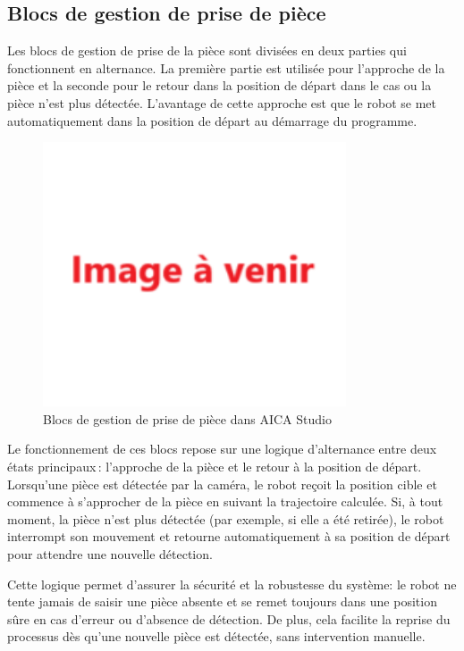 \subsection{Blocs de gestion de prise de pièce}

Les blocs de gestion de prise de la pièce sont divisées en deux parties qui fonctionnent en alternance. La première partie est utilisée pour l'approche de la pièce et la seconde pour le retour dans la position de départ dans le cas ou la pièce n'est plus détectée. L'avantage de cette approche est que le robot se met automatiquement dans la position de départ au démarrage du programme.

\begin{figure}[H]
    \centering
    \includegraphics[width=0.8\textwidth]{assets/figures/img_a_venir.png}
    \caption{Blocs de gestion de prise de pièce dans AICA Studio}
    \label{fig:piece_block}
\end{figure}


Le fonctionnement de ces blocs repose sur une logique d'alternance entre deux états principaux : l'approche de la pièce et le retour à la position de départ. Lorsqu'une pièce est détectée par la caméra, le robot reçoit la position cible et commence à s'approcher de la pièce en suivant la trajectoire calculée. Si, à tout moment, la pièce n'est plus détectée (par exemple, si elle a été retirée), le robot interrompt son mouvement et retourne automatiquement à sa position de départ pour attendre une nouvelle détection.

Cette logique permet d'assurer la sécurité et la robustesse du système: le robot ne tente jamais de saisir une pièce absente et se remet toujours dans une position sûre en cas d'erreur ou d'absence de détection. De plus, cela facilite la reprise du processus dès qu'une nouvelle pièce est détectée, sans intervention manuelle.

